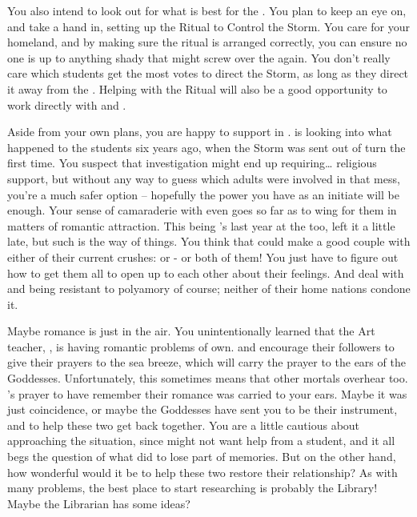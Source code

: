 \documentclass[char]{GL2020}
\begin{document}
You also intend to look out for what is best for the \pShip{}. You plan to keep an eye on, and take a hand in, setting up the Ritual to Control the Storm. You care for your homeland, and by making sure the ritual is arranged correctly, you can ensure no one is up to anything shady that might screw over the \pShippies{} again. You don't really care which students get the most votes to direct the Storm, as long as they direct it away from the \pShip{}. Helping with the Ritual will also be a good opportunity to work directly with \cEbbPriest{} and \cFlowPriest{}.

Aside from your own plans, you are happy to support \cPresident{} in \cPresident{\theirs}. \cPresident{} is looking into what happened to the students six years ago, when the Storm was sent out of turn the first time. You suspect that investigation might end up requiring\ldots{} religious support, but without any way to guess which adults were involved in that mess, you're a much safer option -- hopefully the power you have as an initiate will be enough. Your sense of camaraderie with \cPresident{} even goes so far as to wing\cInitiate{\person} for them in matters of romantic attraction. This being \cPresident{}'s last year at the \pSc{} too, \cPresident{\they} \cPresident{\have} left it a little late, but such is the way of things. You think that \cPresident{} could make a good couple with either of their current crushes: \cHeir{\full} or \cChupStudent{\full} - or both of them! You just have to figure out how to get them all to open up to each other about their feelings. And deal with \cHeir{} and \cChupStudent{} being resistant to polyamory of course; neither of their home nations condone it.

Maybe romance is just in the air. You unintentionally learned that the Art teacher, \cChupAvenger{\full}, is having romantic problems of \cChupAvenger{\their} own. \cEbb{} and \cFlow{} encourage their followers to give their prayers to the sea breeze, which will carry the prayer to the ears of the Goddesses. Unfortunately, this sometimes means that other mortals overhear too. \cChupAvenger{}'s prayer to have \cHeadScientist{\full} remember their romance was carried to your ears. Maybe it was just coincidence, or maybe the Goddesses have sent you to be their instrument, and to help these two get back together. You are a little cautious about approaching the situation, since \cChupAvenger{} might not want help from a student, and it all begs the question of what \cHeadScientist{} did to lose part of \cHeadScientist{\their} memories. But on the other hand, how wonderful would it be to help these two restore their relationship? As with many problems, the best place to start researching is probably the Library! Maybe the Librarian has some ideas? 
\end{document}
